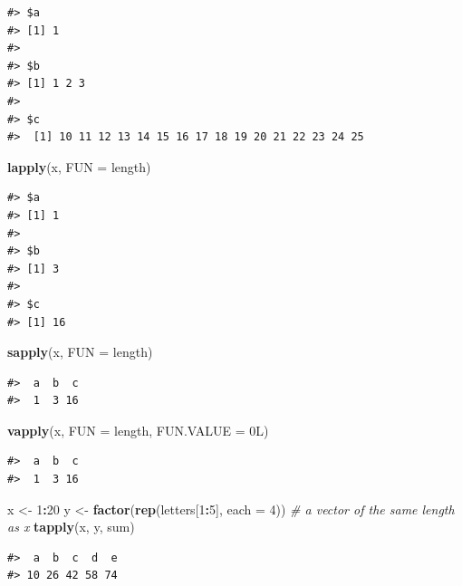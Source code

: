 \documentclass[]{book}
\newenvironment{Shaded}{\begin{snugshade}}{\end{snugshade}}
\newcommand{\KeywordTok}[1]{\textcolor[rgb]{0.13,0.29,0.53}{\textbf{#1}}}
\newcommand{\DataTypeTok}[1]{\textcolor[rgb]{0.13,0.29,0.53}{#1}}
\newcommand{\DecValTok}[1]{\textcolor[rgb]{0.00,0.00,0.81}{#1}}
\newcommand{\StringTok}[1]{\textcolor[rgb]{0.31,0.60,0.02}{#1}}
\newcommand{\CommentTok}[1]{\textcolor[rgb]{0.56,0.35,0.01}{\textit{#1}}}
\newcommand{\OperatorTok}[1]{\textcolor[rgb]{0.81,0.36,0.00}{\textbf{#1}}}
\newcommand{\NormalTok}[1]{#1}
\theoremstyle{definition}
\theoremstyle{definition}
\theoremstyle{definition}
\theoremstyle{remark}
\begin{document}
\begin{verbatim}
#> $a
#> [1] 1
#> 
#> $b
#> [1] 1 2 3
#> 
#> $c
#>  [1] 10 11 12 13 14 15 16 17 18 19 20 21 22 23 24 25
\end{verbatim}

\begin{Shaded}
\begin{Highlighting}[]
\KeywordTok{lapply}\NormalTok{(x, }\DataTypeTok{FUN =}\NormalTok{ length) }
\end{Highlighting}
\end{Shaded}

\begin{verbatim}
#> $a
#> [1] 1
#> 
#> $b
#> [1] 3
#> 
#> $c
#> [1] 16
\end{verbatim}

\begin{Shaded}
\begin{Highlighting}[]
\KeywordTok{sapply}\NormalTok{(x, }\DataTypeTok{FUN =}\NormalTok{ length) }
\end{Highlighting}
\end{Shaded}

\begin{verbatim}
#>  a  b  c 
#>  1  3 16
\end{verbatim}

\begin{Shaded}
\begin{Highlighting}[]
\KeywordTok{vapply}\NormalTok{(x, }\DataTypeTok{FUN =}\NormalTok{ length, }\DataTypeTok{FUN.VALUE =}\NormalTok{ 0L) }
\end{Highlighting}
\end{Shaded}

\begin{verbatim}
#>  a  b  c 
#>  1  3 16
\end{verbatim}

\begin{Shaded}
\begin{Highlighting}[]
\NormalTok{x <-}\StringTok{ }\DecValTok{1}\OperatorTok{:}\DecValTok{20}
\NormalTok{y <-}\StringTok{ }\KeywordTok{factor}\NormalTok{(}\KeywordTok{rep}\NormalTok{(letters[}\DecValTok{1}\OperatorTok{:}\DecValTok{5}\NormalTok{], }\DataTypeTok{each =} \DecValTok{4}\NormalTok{)) }\CommentTok{# a vector of the same length as x}
\KeywordTok{tapply}\NormalTok{(x, y, sum) }
\end{Highlighting}
\end{Shaded}

\begin{verbatim}
#>  a  b  c  d  e 
#> 10 26 42 58 74
\end{verbatim}
\end{document}
